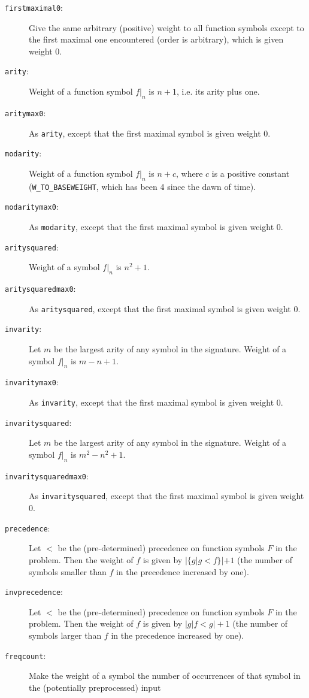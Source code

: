 \documentclass{report}
\begin{document}
\begin{description}
\item[\texttt{firstmaximal0}:] Give the same arbitrary (positive)
  weight to all function symbols except to the first maximal one
  encountered (order is arbitrary), which is given weight 0.
\item[\texttt{arity}:] Weight of a function symbol $f|_n$ is $n+1$,
  i.e. its arity plus one.
\item[\texttt{aritymax0}:] As \texttt{arity}, except that the
  first maximal symbol is given weight 0.
\item[\texttt{modarity}:] Weight of a function symbol $f|_n$ is $n+c$,
  where $c$ is a positive constant (\texttt{W\_TO\_BASEWEIGHT}, which
  has been 4 since the dawn of time).
\item[\texttt{modaritymax0}:] As \texttt{modarity}, except that the
  first maximal symbol is given weight 0.
\item[\texttt{aritysquared}:] Weight of a symbol $f|_n$ is $n^2+1$.
\item[\texttt{aritysquaredmax0}:] As \texttt{aritysquared}, except
  that the first maximal symbol is given weight 0.
\item[\texttt{invarity}:] Let $m$ be the largest arity of any symbol
  in the signature.  Weight of a symbol $f|_n$ is $m-n+1$.
\item[\texttt{invaritymax0}:] As \texttt{invarity}, except
  that the first maximal symbol is given weight 0.
\item[\texttt{invaritysquared}:] Let $m$ be the largest arity of any symbol
  in the signature.  Weight of a symbol $f|_n$ is $m^2-n^2+1$.
\item[\texttt{invaritysquaredmax0}:] As \texttt{invaritysquared},
  except that the first maximal symbol is given weight 0.
\item[\texttt{precedence}:] Let $<$ be the (pre-determined) precedence
  on function symbols $F$ in the problem. Then the weight of $f$ is
  given by $|\{g|g<f\}|+1$ (the number of symbols smaller than $f$ in
  the precedence increased by one).
\item[\texttt{invprecedence}:] Let $<$ be the (pre-determined)
  precedence on function symbols $F$ in the problem. Then the weight
  of $f$ is given by $|{g|f<g}|+1$ (the number of symbols larger than
  $f$ in the precedence increased by one).
\item[\texttt{freqcount}:] Make the weight of a symbol the number of
  occurrences of that symbol in the (potentially preprocessed) input

\end{description}
\end{document}

